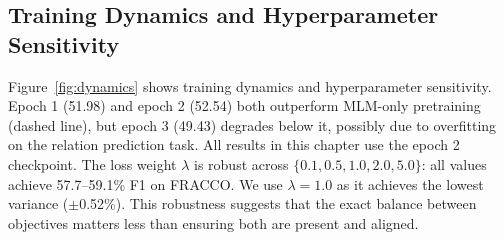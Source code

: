 \subsection{Training Dynamics and Hyperparameter Sensitivity}
\label{sec:dynamics}

Figure~\ref{fig:dynamics} shows training dynamics and hyperparameter sensitivity. Epoch 1 (51.98) and epoch 2 (52.54) both outperform MLM-only pretraining (dashed line), but epoch 3 (49.43) degrades below it, possibly due to overfitting on the relation prediction task. All results in this chapter use the epoch 2 checkpoint. The loss weight $\lambda$ is robust across $\{0.1, 0.5, 1.0, 2.0, 5.0\}$: all values achieve 57.7--59.1\% F1 on FRACCO. We use $\lambda=1.0$ as it achieves the lowest variance ($\pm$0.52\%). This robustness suggests that the exact balance between objectives matters less than ensuring both are present and aligned.

